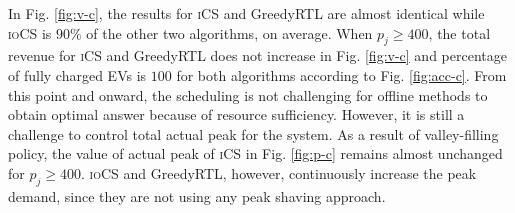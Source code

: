 \documentclass[journal]{IEEEtran}
\newcommand{\revv}[1]{{\color{black}#1}}%
\newcommand{\ics}{\textsc{iCS}\xspace}
\newcommand{\iocs}{\textsc{ioCS}\xspace}
\begin{document}
In Fig. \ref{fig:v-c}, the results for \ics and GreedyRTL are almost identical while \iocs is \revv{$90\%$} of the other two algorithms, on average. When \revv{$p_j\geq 400$}, the total revenue for \ics and GreedyRTL does not increase in Fig. \ref{fig:v-c} and percentage of fully charged EVs is $100$ for both algorithms according to Fig. \ref{fig:acc-c}. From this point and onward, the scheduling is not challenging for offline methods to obtain optimal answer because of resource sufficiency. However, it is still a challenge to control total actual peak for the system. As a result of valley-filling policy, the value of actual peak of \ics in Fig. \ref{fig:p-c} remains almost unchanged for \revv{$p_{j}\geq 400$}.  \iocs and GreedyRTL, however, continuously increase the peak demand, since they are not using any peak shaving approach.
			
			
			
			
\end{document}
